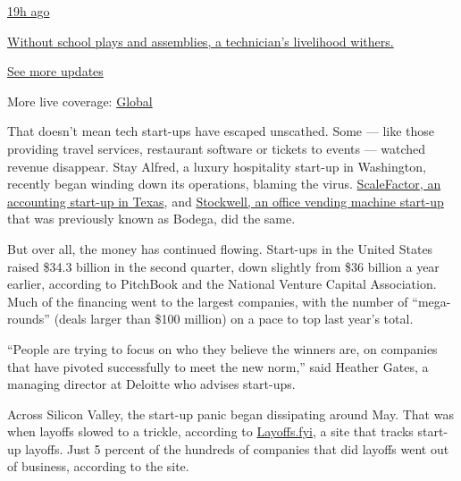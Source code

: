 \href{https://www.nytimes3xbfgragh.onion/live/2020/08/20/business/stock-market-today-coronavirus?action=click\&pgtype=Article\&state=default\&region=MAIN_CONTENT_1\&context=storylines_live_updates\#without-school-plays-and-assemblies-a-technicians-livelihood-withers}{19h
ago}

\href{https://www.nytimes3xbfgragh.onion/live/2020/08/20/business/stock-market-today-coronavirus?action=click\&pgtype=Article\&state=default\&region=MAIN_CONTENT_1\&context=storylines_live_updates\#without-school-plays-and-assemblies-a-technicians-livelihood-withers}{Without
school plays and assemblies, a technician's livelihood withers.}

\href{https://www.nytimes3xbfgragh.onion/live/2020/08/20/business/stock-market-today-coronavirus?action=click\&pgtype=Article\&state=default\&region=MAIN_CONTENT_1\&context=storylines_live_updates}{See
more updates}

More live coverage:
\href{https://www.nytimes3xbfgragh.onion/2020/08/20/world/coronavirus-covid.html?action=click\&pgtype=Article\&state=default\&region=MAIN_CONTENT_1\&context=storylines_live_updates}{Global}

That doesn't mean tech start-ups have escaped unscathed. Some --- like
those providing travel services, restaurant software or tickets to
events --- watched revenue disappear. Stay Alfred, a luxury hospitality
start-up in Washington, recently began winding down its operations,
blaming the virus.
\href{https://scalefactor.com/scaleblog/a-message-from-the-founder-and-ceo/}{ScaleFactor,
an accounting start-up in Texas}, and
\href{https://techcrunch.com/2020/06/15/stockwell-the-ai-vending-machine-startup-formerly-known-as-bodega-is-shutting-down-july-1/}{Stockwell,
an office vending machine start-up} that was previously known as Bodega,
did the same.

But over all, the money has continued flowing. Start-ups in the United
States raised \$34.3 billion in the second quarter, down slightly from
\$36 billion a year earlier, according to PitchBook and the National
Venture Capital Association. Much of the financing went to the largest
companies, with the number of ``mega-rounds'' (deals larger than \$100
million) on a pace to top last year's total.

``People are trying to focus on who they believe the winners are, on
companies that have pivoted successfully to meet the new norm,'' said
Heather Gates, a managing director at Deloitte who advises start-ups.

Across Silicon Valley, the start-up panic began dissipating around May.
That was when layoffs slowed to a trickle, according to
\href{https://layoffs.fyi/}{Layoffs.fyi}, a site that tracks start-up
layoffs. Just 5 percent of the hundreds of companies that did layoffs
went out of business, according to the site.

